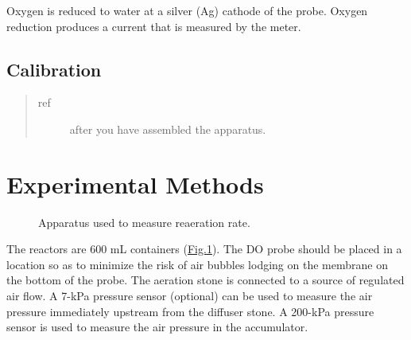 \documentclass[letterpaper,10pt,english]{sphinxmanual}
\let\sphinxpxdimen\pdfpxdimen\else\newdimen\sphinxpxdimen
\begin{document}
Oxygen is reduced to water at a silver (Ag) cathode of the probe. Oxygen reduction produces a current that is measured by the meter.


\subsection{Calibration}
\label{\detokenize{Gas_Transfer/Gas_Transfer:calibration}}\begin{quote}\begin{description}
\item[{ref}] \leavevmode
{} after you have assembled the apparatus.

\end{description}\end{quote}


\section{Experimental Methods}
\label{\detokenize{Gas_Transfer/Gas_Transfer:experimental-methods}}\label{\detokenize{Gas_Transfer/Gas_Transfer:heading-gas-transfer-experimental-methods}}
\begin{figure}[htbp]
\centering
\capstart

\noindent\sphinxincludegraphics[width=600\sphinxpxdimen]{{Schematic1}.png}
\caption{Apparatus used to measure reaeration rate.}\label{\detokenize{Gas_Transfer/Gas_Transfer:id4}}\label{\detokenize{Gas_Transfer/Gas_Transfer:figure-gas-schematic}}\end{figure}

The reactors are 600 mL containers (\hyperref[\detokenize{Gas_Transfer/Gas_Transfer:figure-gas-schematic}]{Fig.\@ \ref{\detokenize{Gas_Transfer/Gas_Transfer:figure-gas-schematic}}}). The DO probe should be placed in a location so as to minimize the risk of air bubbles lodging on the membrane on the bottom of the probe. The aeration stone is connected to a source of regulated air flow. A 7-kPa pressure sensor (optional) can be used to measure the air pressure immediately upstream from the diffuser stone. A 200-kPa pressure sensor is used to measure the air pressure in the accumulator.
\end{document}
